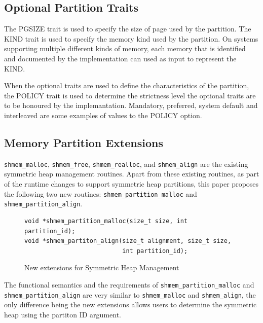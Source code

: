 \subsection{Optional Partition Traits}
\label{src:smempart/optional}
The PGSIZE trait is used to specify the size of page used by the partition.
The KIND trait is used to specify the memory kind used by the partition.
On systems supporting multiple different kinds of memory, each memory
that is identified and documented by the implementation can used as input
to represent the KIND.

When the optional traits are used to define the characteristics of the
partition, the POLICY trait is used to determine the strictness level
the optional traits are to be honoured by the implemantation. Mandatory,
preferred, system default and interleaved are some examples of values
to the POLICY option.

\subsection{Memory Partition Extensions}
\label{src:smempart/extensions}
\texttt{shmem\_malloc}, \texttt{shmem\_free}, \texttt{shmem\_realloc},
and \texttt{shmem\_align} are the existing symmetric heap management
routines. Apart from these existing routines, as part of the runtime
changes to support symmetric heap partitions, this paper proposes the
following two new routines: \texttt{shmem\_partition\_malloc} and
\texttt{shmem\_partition\_align}.

\begin{figure}
    \lstset{language=c,
            keywordstyle=\bfseries,
            basicstyle=\tt\small,
            frame=single}
    \begin{lstlisting}
void *shmem_partition_malloc(size_t size, int partition_id);
void *shmem_partiton_align(size_t alignment, size_t size,
                           int partition_id);
    \end{lstlisting}
    \caption{New extensions for Symmetric Heap Management}
    \label{fig:extensions}
\end{figure}

The functional semantics and the requirements of
\texttt{shmem\_partition\_malloc} and \texttt{shmem\_partition\_align}
are very similar to \texttt{shmem\_malloc} and \texttt{shmem\_align},
the only difference being the new extensions allows users to determine
the symmetric heap using the partiton ID argument.
